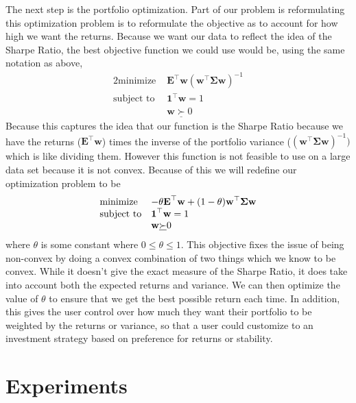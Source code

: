 \documentclass{article}
\begin{document}
The next step is the portfolio optimization.  Part of our problem is reformulating this optimization problem is to reformulate the objective as to account for how high we want the returns.  Because we want our data to reflect the idea of the Sharpe Ratio, the best objective function we could use would be, using the same notation as above,
\begin{alignat*}{2}
    \text{minimize }   &   \textbf{E}^\top \textbf{w} (\textbf{w}^\top \mathbf{\Sigma} \textbf{w})^{-1}\\
    \text{subject to } 
    & \textbf{1}^\top \textbf{w} = 1 \\
    & \textbf{w} \underline{\succ} 0
\end{alignat*}
Because this captures the idea that our function is the Sharpe Ratio because we have the returns ($\textbf{E}^\top \textbf{w}$) times the inverse of the portfolio variance ($(\textbf{w}^\top \mathbf{\Sigma} \textbf{w})^{-1})$ which is like dividing them.  However this function is not feasible to use on a large data set because it is not convex.  Because of this we will redefine our optimization problem to be
\begin{equation}
\begin{array}{ll@{}ll}
\text{minimize}  & \displaystyle -\theta \textbf{E}^\top \textbf{w} + (1-\theta)\textbf{w}^\top \mathbf{\Sigma} \textbf{w} &\\
\text{subject to}& \displaystyle\textbf{1}^\top \textbf{w} = 1 \\
                 &  \textbf{w} \underline{\succ} 0                                     
\end{array}
\end{equation}
where $\theta$ is some constant where $0 \leq \theta \leq 1$. This objective fixes the issue of being non-convex by doing a convex combination of two things which we know to be convex.  While it doesn't give the exact measure of the Sharpe Ratio, it does take into account both the expected returns and variance.  We can then optimize the value of $\theta$ to ensure that we get the best possible return each time.  In addition, this gives the user control over how much they want their portfolio to be weighted by the returns or variance, so that a user could customize to an investment strategy based on preference for returns or stability.

\section{Experiments}
\label{exper}
\end{document}
